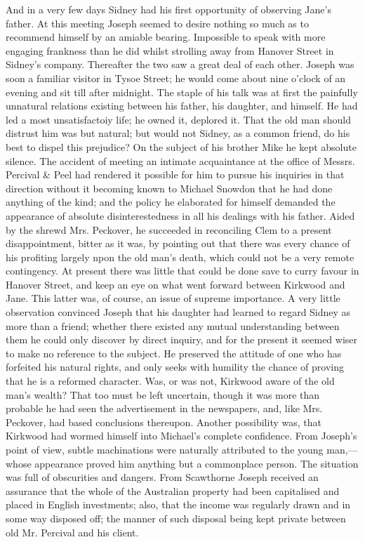 And in a very few days Sidney had his first opportunity of observing
Jane's father. At this meeting Joseph seemed to desire nothing so much
as to recommend himself by an amiable bearing. Impossible to speak with
more engaging frankness than he did whilst strolling away from Hanover
Street in Sidney's company. Thereafter the two saw a great deal of each
other. Joseph was soon a familiar visitor in Tysoe Street; he would come
about {}nine o'clock of an evening and sit till after midnight. The
staple of his talk was at first the painfully unnatural relations
existing between his father, his daughter, and himself. He had led a
most unsatisfactoiy life; he owned it, deplored it. That the old man
should distrust him was but natural; but would not Sidney, as a common
friend, do his best to dispel this prejudice? On the subject of his
brother Mike he kept absolute silence. The accident of meeting an
intimate acquaintance at the office of Messrs. Percival \& Peel had
rendered it possible for him to pursue his inquiries in that direction
without it becoming known to Michael Snowdon that he had done anything
of the kind; and the policy he elaborated for himself demanded the
appearance of absolute disinterestedness in all his dealings with his
father. Aided by the shrewd Mrs. Peckover, he succeeded in reconciling
Clem to a present disappointment, bitter as it was, by pointing out that
there was every chance of his profiting largely npon the old man's
death, which could not be a very {}remote contingency. At present there
was little that could be done save to curry favour in Hanover Street,
and keep an eye on what went forward between Kirkwood and Jane. This
latter was, of course, an issue of supreme importance. A very little
observation convinced Joseph that his daughter had learned to regard
Sidney as more than a friend; whether there existed any mutual
understanding between them he could only discover by direct inquiry, and
for the present it seemed wiser to make no reference to the subject. He
preserved the attitude of one who has forfeited his natural rights, and
only seeks with humility the chance of proving that he is a reformed
character. Was, or was not, Kirkwood aware of the old man's wealth? That
too must be left uncertain, though it was more than probable he had seen
the advertisement in the newspapers, and, like Mrs. Peckover, had based
conclusions thereupon. Another possibility was, that Kirkwood had wormed
himself into Michael's complete confidence. From Joseph's point of view,
subtle machinations were {}naturally attributed to the young
man,---whose appearance proved him anything but a commonplace person.
The situation was full of obscurities and dangers. From Scawthorne
Joseph received an assurance that the whole of the Australian property
had been capitalised and placed in English investments; also, that the
income was regularly drawn and in some way disposed off; the manner of
such disposal being kept private between old Mr. Percival and his
client.

